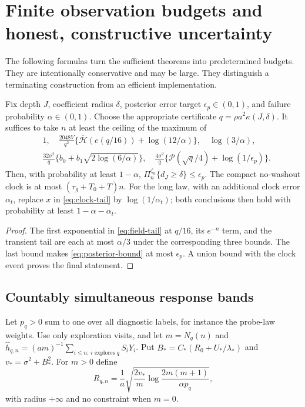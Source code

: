 \section{Finite observation budgets and honest, constructive uncertainty}
\label{sec:operations}
The following formulas turn the sufficient theorems into predetermined budgets.
They are intentionally conservative and may be large. They distinguish a
terminating construction from an efficient implementation.

\begin{proposition}
\label{prop:budget}
Fix depth $J$, coefficient radius $\delta$, posterior error target
$\epsilon_p\in(0,1)$, and failure probability $\alpha\in(0,1)$.
Choose the appropriate certificate $q=\rho a^2\kappa(J,\delta)$. It suffices
to take $n$ at least the ceiling of the maximum of
\begin{equation}
\begin{split}
 &1,\quad \frac{2048V}{q^2}
  \{\overline{\mathcal H}(e(q/16))+\log(12/\alpha)\},
 \quad \log(3/\alpha),\\
 &\frac{32\sigma^2}{q}\{b_0+b_1\sqrt{2\log(6/\alpha)}\},\quad
 \frac{4\sigma^2}{q}\{\mathcal P(\sqrt q/4)+\log(1/\epsilon_p)\}.
\end{split}\label{eq:sample-budget}
\end{equation}
Then, with probability at least $1-\alpha$,
$\Pi_n^{\zeta_n}\{d_J\ge\delta\}\le\epsilon_p$.
The compact no-washout clock is at most $(\tau_g+T_0+T)n$.
For the long law, with an additional clock error $\alpha_t$, replace $x$ in
\eqref{eq:clock-tail} by $\log(1/\alpha_t)$; both conclusions then hold with
probability at least $1-\alpha-\alpha_t$.
\end{proposition}
\begin{proof}
The first exponential in \eqref{eq:field-tail} at $q/16$, its $e^{-n}$ term,
and the transient tail are each at most $\alpha/3$ under the corresponding
three bounds. The last bound makes \eqref{eq:posterior-bound} at most
$\epsilon_p$. A union bound with the clock event proves the final statement.
\end{proof}

\subsection{Countably simultaneous response bands}
Let $p_q>0$ sum to one over all diagnostic labels, for instance the probe-law
weights. Use only exploration visits, and let $m=N_q(n)$ and
$\widehat h_{q,n}=(am)^{-1}\sum_{i\le n:\,i\text{ explores }q}S_iY_i$.
Put $B_*=C_*(R_0+U_*/\lambda_*)$ and $v_*=\sigma^2+B_*^2$. For $m>0$ define
\begin{equation}
 R_{q,n}=\frac1a\sqrt{\frac{2v_*}{m}
                  \log\frac{2m(m+1)}{\alpha p_q}},
 \label{eq:bands}
\end{equation}
with radius $+\infty$ and no constraint when $m=0$.

